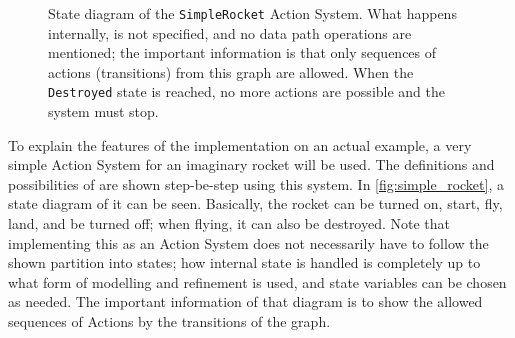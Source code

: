 \begin{figure}[b]
  \centering
  \scriptsize\sffamily
  \caption{State diagram of the \lstinline|SimpleRocket| Action System. What happens internally, is
    not specified, and no data path operations are mentioned; the important information is that only
    sequences of actions (transitions) from this graph are allowed. When the \lstinline|Destroyed|
    state is reached, no more actions are possible and the system must
    stop.\label{fig:simple_rocket}}
\end{figure}

To explain the features of the implementation on an actual example, a very simple Action System for
an imaginary rocket will be used. The definitions and possibilities of \actium{} are shown
step-be-step using this system. In \autoref{fig:simple_rocket}, a state diagram of it can be
seen. Basically, the rocket can be turned on, start, fly, land, and be turned off; when flying, it
can also be destroyed. Note that implementing this as an Action System does not necessarily have to
follow the shown partition into states; how internal state is handled is completely up to what form
of modelling and refinement is used, and state variables can be chosen as needed. The important
information of that diagram is to show the allowed sequences of Actions by the transitions of the
graph.


